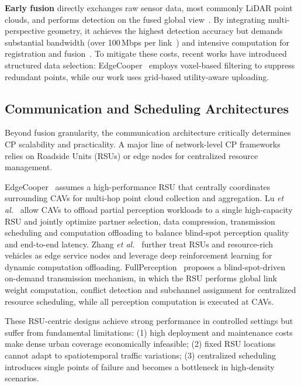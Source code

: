 \documentclass[conference]{IEEEtran}
\begin{document}
\textbf{Early fusion} directly exchanges raw sensor data, most commonly LiDAR point clouds, and performs detection on the fused global view~\cite{chen2019cooper}. By integrating multi-perspective geometry, it achieves the highest detection accuracy but demands substantial bandwidth (over 100\,Mbps per link~\cite{li2023hetSDN}\cite{liang2025fullperception}) and intensive computation for registration and fusion~\cite{zhang2021emp}. To mitigate these costs, recent works have introduced structured data selection: EdgeCooper~\cite{luo2023edgecooper} employs voxel-based filtering to suppress redundant points, while our work uses grid-based utility-aware uploading.

\subsection{Communication and Scheduling Architectures}

Beyond fusion granularity, the communication architecture critically determines CP scalability and practicality. A major line of network-level CP frameworks relies on Roadside Units (RSUs) or edge nodes for centralized resource management.

EdgeCooper~\cite{luo2023edgecooper} assumes a high-performance RSU that centrally coordinates surrounding CAVs for multi-hop point cloud collection and aggregation. Lu \emph{et al.}~\cite{lu2025joint} allow CAVs to offload partial perception workloads to a single high-capacity RSU and jointly optimize partner selection, data compression, transmission scheduling and computation offloading to balance blind-spot perception quality and end-to-end latency. Zhang \emph{et al.}~\cite{zhao2025multiDRL} further treat RSUs and resource-rich vehicles as edge service nodes and leverage deep reinforcement learning for dynamic computation offloading.  FullPerception~\cite{liang2025fullperception} proposes a blind-spot-driven on-demand transmission mechanism, in which the RSU performs global link weight computation, conflict detection and subchannel assignment for centralized resource scheduling, while all perception computation is executed at CAVs.

These RSU-centric designs achieve strong performance in controlled settings but suffer from fundamental limitations: (1) high deployment and maintenance costs make dense urban coverage economically infeasible; (2) fixed RSU locations cannot adapt to spatiotemporal traffic variations; (3) centralized scheduling introduces single points of failure and becomes a bottleneck in high-density scenarios.
\end{document}
